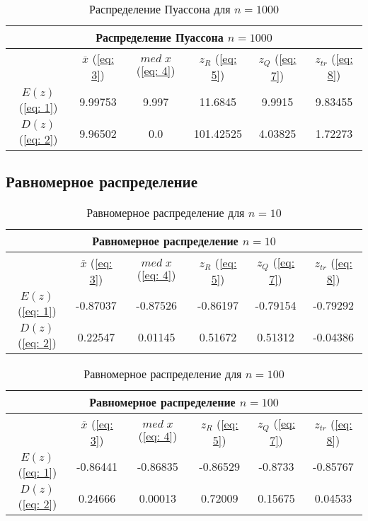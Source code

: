 \documentclass{article}
\begin{document}
\begin{table}[hb]
\begin{center}
\begin{tabular}{|c|c|c|c|c|c|}
\hline 
\multicolumn{6}{|c|}{Распределение Пуассона $n=1000$} \\ 
\hline 
  & $\overline{x}$ (\ref{eq: 3}) & $med \; x$ (\ref{eq: 4}) & $z_R$ (\ref{eq: 5}) & $z_Q$ (\ref{eq: 7}) & $z_{tr}$ (\ref{eq: 8}) \\ 
\hline 
$E(z)$ (\ref{eq: 1}) & 9.99753 & 9.997 & 11.6845 & 9.9915 & 9.83455 \\ 
\hline 
$D(z)$ (\ref{eq: 2}) & 9.96502 & 0.0 & 101.42525 & 4.03825 & 1.72273 \\ 
\hline 
\end{tabular} 
\caption{Распределение Пуассона для $n=1000$}
\end{center}
\end{table}

\newpage
\subsection{Равномерное распределение}

\begin{table}[hb]
\begin{center}
\begin{tabular}{|c|c|c|c|c|c|}
\hline 
\multicolumn{6}{|c|}{Равномерное распределение $n=10$} \\ 
\hline 
  & $\overline{x}$ (\ref{eq: 3}) & $med \; x$ (\ref{eq: 4}) & $z_R$ (\ref{eq: 5}) & $z_Q$ (\ref{eq: 7}) & $z_{tr}$ (\ref{eq: 8}) \\ 
\hline 
$E(z)$ (\ref{eq: 1}) & -0.87037 & -0.87526 & -0.86197 & -0.79154 & -0.79292 \\ 
\hline 
$D(z)$ (\ref{eq: 2}) & 0.22547 & 0.01145 & 0.51672 & 0.51312 & -0.04386 \\ 
\hline 
\end{tabular} 
\caption{Равномерное распределение для $n=10$}
\end{center}
\end{table}

\begin{table}[hb]
\begin{center}
\begin{tabular}{|c|c|c|c|c|c|}
\hline 
\multicolumn{6}{|c|}{Равномерное распределение $n=100$} \\ 
\hline 
  & $\overline{x}$ (\ref{eq: 3}) & $med \; x$ (\ref{eq: 4}) & $z_R$ (\ref{eq: 5}) & $z_Q$ (\ref{eq: 7}) & $z_{tr}$ (\ref{eq: 8}) \\ 
\hline 
$E(z)$ (\ref{eq: 1}) & -0.86441 & -0.86835 & -0.86529 & -0.8733 & -0.85767 \\ 
\hline 
$D(z)$ (\ref{eq: 2}) & 0.24666 & 0.00013 & 0.72009 & 0.15675 & 0.04533 \\ 
\hline 
\end{tabular} 
\caption{Равномерное распределение для $n=100$}
\end{center}
\end{table}
\end{document}
